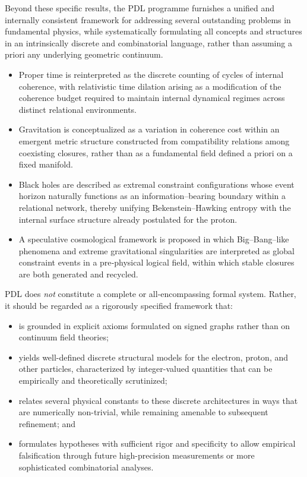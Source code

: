 \documentclass[11pt,a4paper]{article}
\begin{document}
Beyond these specific results, the PDL programme furnishes a unified and internally consistent framework for addressing several outstanding problems in fundamental physics, while systematically formulating all concepts and structures in an intrinsically discrete and combinatorial language, rather than assuming a priori any underlying geometric continuum.

\begin{itemize}[label=-]
    \item Proper time is reinterpreted as the discrete counting of cycles of internal coherence, with relativistic time dilation arising as a modification of the coherence budget required to maintain internal dynamical regimes across distinct relational environments.
    \item Gravitation is conceptualized as a variation in coherence cost within an emergent metric structure constructed from compatibility relations among coexisting closures, rather than as a fundamental field defined a priori on a fixed manifold.
    \item Black holes are described as extremal constraint configurations whose event horizon naturally functions as an information–bearing boundary within a relational network, thereby unifying Bekenstein–Hawking entropy with the internal surface structure already postulated for the proton.
    \item A speculative cosmological framework is proposed in which Big–Bang–like phenomena and extreme gravitational singularities are interpreted as global constraint events in a pre‑physical logical field, within which stable closures are both generated and recycled.
\end{itemize}

PDL does \emph{not} constitute a complete or all-encompassing formal system. Rather, it should be regarded as a rigorously specified framework that:
\begin{itemize}[label=-]
    \item is grounded in explicit axioms formulated on signed graphs rather than on continuum field theories;
    \item yields well-defined discrete structural models for the electron, proton, and other particles, characterized by integer-valued quantities that can be empirically and theoretically scrutinized;
    \item relates several physical constants to these discrete architectures in ways that are numerically non-trivial, while remaining amenable to subsequent refinement; and
    \item formulates hypotheses with sufficient rigor and specificity to allow empirical falsification through future high-precision measurements or more sophisticated combinatorial analyses.
\end{itemize}
\end{document}
